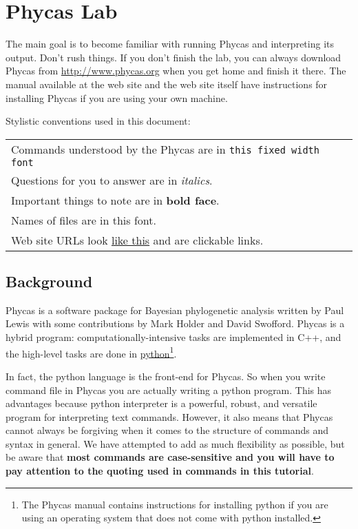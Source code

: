 \documentclass{article}
\newcommand{\cmd}[1]{\texttt{#1}\xspace}
\newcommand{\phycas}{Phycas\xspace}
\newcommand{\localfile}[1]{\textsf{#1}\xspace}
\begin{document}
\tableofcontents


\newpage
\section{\phycas Lab}

The main goal is to become familiar with running \phycas and interpreting its output. 
Don't rush things. 
If you don't finish the lab, you can always download 
\phycas from \url{http://www.phycas.org} when you get home and finish it there.
The manual available at the web site and the web site itself have instructions for 
installing \phycas if you are using your own machine.

Stylistic conventions used in this document:

\begin{tabular}{l}
	Commands understood by the \phycas are in \cmd{this fixed width font} \\
	Questions for you to answer are in {\em italics}. \\
	Important things to note are in {\bf bold face}. \\
	Names of files \localfile{are in  this font}.\\
	Web site URLs look \href{http://www.google.com}{like this} and are clickable links.
\end{tabular}

\subsection{Background}
\phycas is a software package for Bayesian phylogenetic analysis written by Paul Lewis with
some contributions by Mark Holder and David Swofford.
\phycas is a hybrid program: computationally-intensive tasks are implemented in C++, and the high-level
tasks are done in \href{http://www.python.org/}{python}\footnote{The Phycas manual contains instructions for installing python if you are using an operating system
that does not come with python installed.}.

In fact, the python language is the front-end for \phycas. 
So when you write command file in \phycas you are actually writing a python program.
This has advantages because python interpreter is a powerful, robust, and versatile program for interpreting text commands.
However, it also means that \phycas cannot always be forgiving when it comes to the structure of commands and syntax in general.
We have attempted to add as much flexibility as possible, but be aware that {\bf most commands are case-sensitive and you will have to pay attention to the quoting used in commands in this tutorial}.
\end{document}
